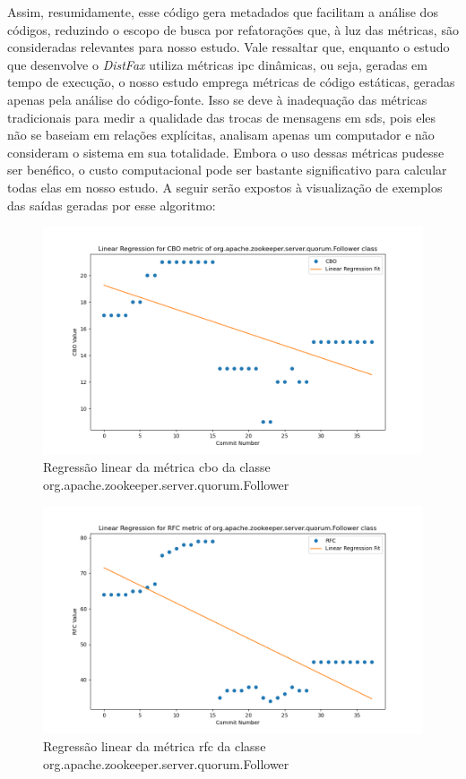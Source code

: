 Assim, resumidamente, esse código gera metadados que facilitam a análise dos códigos, reduzindo o escopo de busca por refatorações que, à luz das métricas, são consideradas relevantes para nosso estudo. Vale ressaltar que, enquanto o estudo que desenvolve o \textit{DistFax} \cite{DistFax} utiliza métricas \gls{ipc} dinâmicas, ou seja, geradas em tempo de execução, o nosso estudo emprega métricas de código estáticas, geradas apenas pela análise do código-fonte. Isso se deve à inadequação das métricas tradicionais para medir a qualidade das trocas de mensagens em \gls{sds}, pois eles não se baseiam em relações explícitas, analisam apenas um computador e não consideram o sistema em sua totalidade. Embora o uso dessas métricas pudesse ser benéfico, o custo computacional pode ser bastante significativo para calcular todas elas em nosso estudo.
A seguir serão expostos à visualização de exemplos das saídas geradas por esse algoritmo:

\begin{figure}[h]
    \centering
    \includegraphics[width=0.8\linewidth]{figuras/Output/Metrics_Predictions/CBO.png}
    \caption{Regressão linear da métrica \gls{cbo} da classe org.apache.zookeeper.server.quorum.Follower}
    \label{fig:RlCBO}
\end{figure}

\begin{figure}[h]
    \centering
    \includegraphics[width=0.8\linewidth]{figuras/Output/Metrics_Predictions/RFC.png}
    \caption{Regressão linear da métrica \gls{rfc} da classe org.apache.zookeeper.server.quorum.Follower}
    \label{fig:RlRFC}
\end{figure}


